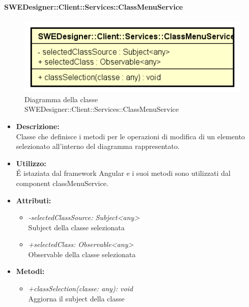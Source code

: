           	\paragraph{SWEDesigner::Client::Services::ClassMenuService}
          	\begin{figure}[h!]
			\centering
			\includegraphics[scale=0.8]{Classi/SWEDesigner__Client__Services__ClassMenuService.png}
			\caption{Diagramma della classe SWEDesigner::Client::Services::ClassMenuService}
 			\end{figure}
				\begin{itemize}
          			\item \textbf{Descrizione:}\\
          			Classe che definisce i metodi per le operazioni di modifica di un elemento selezionato all’interno del diagramma rappresentato.
          			\item \textbf{Utilizzo:}\\
          			É istaziata dal framework Angular e i suoi metodi sono utilizzati dal component classMenuService.
          			\item \textbf{Attributi:}\\
          			\begin{itemize}
          				\item \emph{-selectedClassSource: Subject<any>}\\
            			Subject della classe selezionata
            			\item \emph{+selectedClass: Observable<any>}\\
            			Observable della classe selezionata
          			\end{itemize}
          			\item \textbf{Metodi:}\\
          			\begin{itemize}
          				\item \emph{+classSelection(classe: any): void}\\
            			Aggiorna il subject della classe
          			\end{itemize}
          		\end{itemize}
